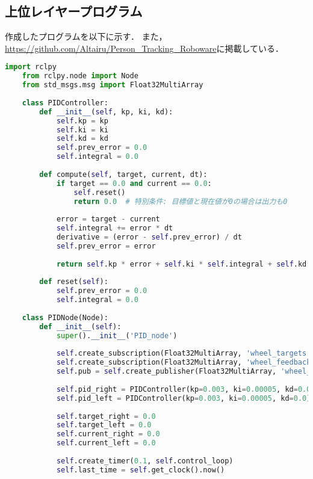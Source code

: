 \subsection{上位レイヤープログラム}

作成したプログラムを以下に示す．
また，\url{https://github.com/Altairu/Person_Tracking_Roboware}に掲載している．

\begin{lstlisting}[language=Python, caption=PID\_node.py]
    import rclpy
    from rclpy.node import Node
    from std_msgs.msg import Float32MultiArray
    
    class PIDController:
        def __init__(self, kp, ki, kd):
            self.kp = kp
            self.ki = ki
            self.kd = kd
            self.prev_error = 0.0
            self.integral = 0.0
    
        def compute(self, target, current, dt):
            if target == 0.0 and current == 0.0:
                self.reset()
                return 0.0  # 特別条件: 目標値と現在値が0の場合は出力も0
    
            error = target - current
            self.integral += error * dt
            derivative = (error - self.prev_error) / dt
            self.prev_error = error
    
            return self.kp * error + self.ki * self.integral + self.kd * derivative
    
        def reset(self):
            self.prev_error = 0.0
            self.integral = 0.0
    
    class PIDNode(Node):
        def __init__(self):
            super().__init__('PID_node')
    
            self.create_subscription(Float32MultiArray, 'wheel_targets', self.target_callback, 10)
            self.create_subscription(Float32MultiArray, 'wheel_feedback', self.feedback_callback, 10)
            self.pub = self.create_publisher(Float32MultiArray, 'wheel_controls', 10)
    
            self.pid_right = PIDController(kp=0.003, ki=0.00005, kd=0.0)
            self.pid_left = PIDController(kp=0.003, ki=0.00005, kd=0.0)
    
            self.target_right = 0.0
            self.target_left = 0.0
            self.current_right = 0.0
            self.current_left = 0.0
    
            self.create_timer(0.1, self.control_loop)
            self.last_time = self.get_clock().now()
    

\end{lstlisting}
